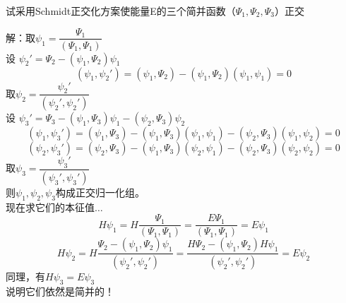 \begin{frame} [allowframebreaks=]
    \frametitle{}
    \begin{exampleblock}{}
        试采用Schmidt正交化方案使能量E的三个简并函数（$\Psi_1, \Psi_2, \Psi_3$）正交
    \end{exampleblock}
    \alert{解：}取$\psi_1=\dfrac{\Psi_1}{(\Psi_1, \Psi_1)}$\\
    设 $\psi_2'=\Psi_2-(\psi_1, \Psi_2)\psi_1$\\
    \begin{equation*}
        (\psi_1, \psi_2')=(\psi_1, \Psi_2)-(\psi_1, \Psi_2)(\psi_1, \psi_1)=0
    \end{equation*}  
    取$\psi_2=\dfrac{\psi_2'}{(\psi_2', \psi_2')}$\\
    设 $\psi_3'=\Psi_3-(\psi_1, \Psi_3)\psi_1-(\psi_2, \Psi_3)\psi_2$\\
    \begin{equation*}
        (\psi_1, \psi_3')=(\psi_1, \Psi_3)-(\psi_1, \Psi_3)(\psi_1, \psi_1)-(\psi_2, \Psi_3)(\psi_1, \psi_2)=0
    \end{equation*}
    \begin{equation*}
        (\psi_2, \psi_3')=(\psi_2, \Psi_3)-(\psi_1, \Psi_3)(\psi_2, \psi_1)-(\psi_2, \Psi_3)(\psi_2, \psi_2)=0
    \end{equation*}
    取$\psi_3=\dfrac{\psi_3'}{(\psi_3', \psi_3')}$\\
    则$\psi_1, \psi_2, \psi_3$构成正交归一化组。\\
    现在求它们的本征值$\dots$\\
    $$ H\psi_1= H \dfrac{\Psi_1}{(\Psi_1, \Psi_1)} =  \dfrac{E\Psi_1}{(\Psi_1, \Psi_1)} = E \psi_1$$
    $$ H\psi_2= H \dfrac{\Psi_2-(\psi_1, \Psi_2)\psi_1}{(\psi_2', \psi_2')} =  \dfrac{H\Psi_2-(\psi_1, \Psi_2)H\psi_1}{(\psi_2', \psi_2')}=E\psi_2$$
    同理，有$ H\psi_3=E\psi_3$\\
    说明它们依然是简并的！
\end{frame} 

